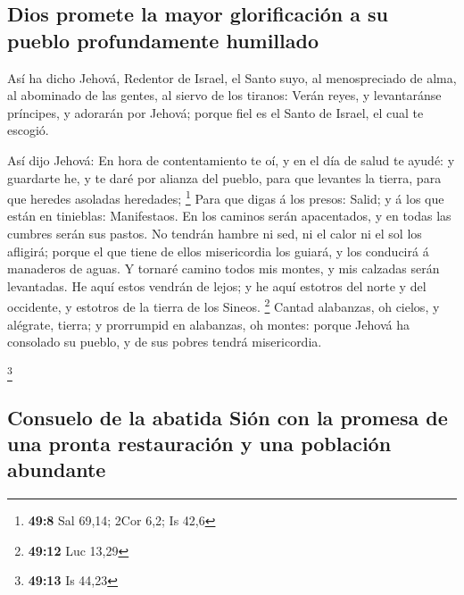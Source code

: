 \hypertarget{dios-promete-la-mayor-glorificaciuxf3n-a-su-pueblo-profundamente-humillado}{%
\subsection{Dios promete la mayor glorificación a su pueblo
profundamente
humillado}\label{dios-promete-la-mayor-glorificaciuxf3n-a-su-pueblo-profundamente-humillado}}

 Así ha dicho Jehová, Redentor de Israel, el Santo suyo,
al menospreciado de alma, al abominado de las gentes, al siervo de los
tiranos: Verán reyes, y levantaránse príncipes, y adorarán por Jehová;
porque fiel es el Santo de Israel, el cual te escogió.

 Así dijo Jehová: En hora de contentamiento te oí, y en el
día de salud te ayudé: y guardarte he, y te daré por alianza del pueblo,
para que levantes la tierra, para que heredes asoladas heredades;
\footnote{\textbf{49:8} Sal 69,14; 2Cor 6,2; Is 42,6} 
Para que digas á los presos: Salid; y á los que están en tinieblas:
Manifestaos. En los caminos serán apacentados, y en todas las cumbres
serán sus pastos.  No tendrán hambre ni sed, ni el calor
ni el sol los afligirá; porque el que tiene de ellos misericordia los
guiará, y los conducirá á manaderos de aguas.  Y tornaré
camino todos mis montes, y mis calzadas serán levantadas.
 He aquí estos vendrán de lejos; y he aquí estotros del
norte y del occidente, y estotros de la tierra de los Sineos.
\footnote{\textbf{49:12} Luc 13,29}  Cantad alabanzas, oh
cielos, y alégrate, tierra; y prorrumpid en alabanzas, oh montes: porque
Jehová ha consolado su pueblo, y de sus pobres tendrá misericordia.

\footnote{\textbf{49:13} Is 44,23}

\hypertarget{consuelo-de-la-abatida-siuxf3n-con-la-promesa-de-una-pronta-restauraciuxf3n-y-una-poblaciuxf3n-abundante}{%
\subsection{Consuelo de la abatida Sión con la promesa de una pronta
restauración y una población
abundante}\label{consuelo-de-la-abatida-siuxf3n-con-la-promesa-de-una-pronta-restauraciuxf3n-y-una-poblaciuxf3n-abundante}}

